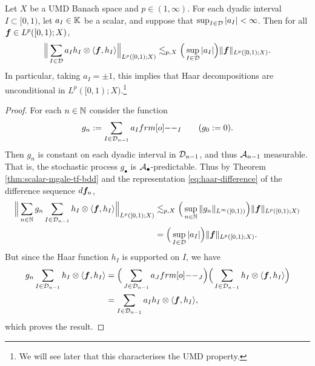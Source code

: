 \begin{prop}\label{prop:haar-multipliers}
  Let $X$ be a UMD Banach space and $p \in (1,\infty)$.
  For each dyadic interval $I \subset [0,1)$, let $a_{I} \in \mathbb{K}$ be a scalar, and suppose that $\sup_{I \in \mathcal{D}} |a_{I}| < \infty$.
  Then for all $\bm{f} \in L^p([0,1);X)$,
  \begin{equation*}
    \Big\| \sum_{I \in \mathcal{D}} a_{I} h_{I} \otimes \langle \bm{f}, h_{I} \rangle \Big\|_{L^p([0,1); X)} \lesssim_{p,X} \Big( \sup_{I \in \mathcal{D}} |a_{I}| \Big) \|\bm{f}\|_{L^p([0,1);X)}.
  \end{equation*}
  In particular, taking $a_{I} = \pm 1$, this implies that Haar decompositions are unconditional in $L^p([0,1);X)$.\footnote{We will see later that this characterises the UMD property.}
\end{prop}

\begin{proof}
  For each $n \in \mathbb{N}$ consider the function
  \begin{equation*}
    g_{n} := \sum_{I \in \mc{D}_{n-1}} a_{I} \1_{I} \qquad (g_{0} := 0).
  \end{equation*}
  Then $g_{n}$ is constant on each dyadic interval in $\mathcal{D}_{n-1}$, and thus $\mathcal{A}_{n-1}$ measurable.
  That is, the stochastic process $g_{\bullet}$ is $\mathcal{A}_{\bullet}$-predictable.
  Thus by Theorem \ref{thm:scalar-mgale-tf-bdd} and the representation \ref{eq:haar-difference} of the difference sequence $d\bm{f}_{n}$,
  \begin{equation*}
    \begin{aligned}
      \Big\| \sum_{n \in \mathbb{N}} g_{n} \sum_{I \in \mathcal{D}_{n-1}} h_{I} \otimes \langle \bm{f}, h_{I} \rangle \Big\|_{L^p([0,1);X)} 
      &\lesssim_{p,X} \Big( \sup_{n \in \mathbb{N}} \|g_{n}\|_{L^\infty([0,1))} \Big) \|\bm{f}\|_{L^p([0,1);X)} \\
      &= \Big( \sup_{I \in \mathcal{D}} |a_{I}| \Big) \|\bm{f}\|_{L^p([0,1);X)}.
  \end{aligned}
\end{equation*}
But since the Haar function $h_{I}$ is supported on $I$, we have
\begin{equation*}
  \begin{aligned}
    g_{n} \sum_{I \in \mc{D}_{n-1}} h_{I} \otimes \langle \mb{f}, h_{I} \rangle 
    &= \Big( \sum_{J \in \mc{D}_{n-1}} a_{J} \1_{J} \Big) \Big( \sum_{I \in \mc{D}_{n-1}} h_{I} \otimes \langle \mb{f}, h_{I} \rangle \Big) \\
    &= \sum_{I \in \mc{D}_{n-1}} a_{I} h_{I} \otimes \langle \mb{f}, h_{I} \rangle,
  \end{aligned}
\end{equation*}
which proves the result.
\end{proof}

